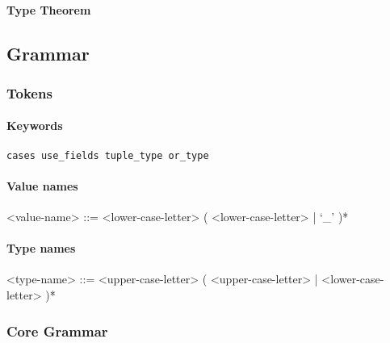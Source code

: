 \documentclass{article}
\begin{document}
\paragraph{Type Theorem}

\subsection{Grammar}
\subsubsection{Tokens}

\paragraph{Keywords}

\begin{verbatim}
cases use_fields tuple_type or_type
\end{verbatim}

\paragraph{Value names}

\begin{grammar}
<value-name> ::= 
<lower-case-letter> ( <lower-case-letter> | `_' )*
\end{grammar}

\paragraph{Type names}

\begin{grammar}
<type-name> ::= 
<upper-case-letter> ( <upper-case-letter> | <lower-case-letter> )*
\end{grammar}



\subsubsection{Core Grammar}

\setlength{\grammarparsep}{20pt}
\setlength{\grammarindent}{12em}
\end{document}
